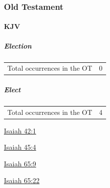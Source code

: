 	\subsubsection{Old Testament} %
		\label{ELECTION-OT}
	
		\paragraph{KJV}
			\label{ELECTION-OT-KJV}
			
			\subparagraph{Election}
	
				\begin{tabular}{ll}
					Total occurrences in the OT & 0
				\end{tabular}
			
			\subparagraph{Elect}
	
				\begin{tabular}{ll}
					Total occurrences in the OT & 4
				\end{tabular}
				
				\begin{compactdesc}
					\item[{\hyperref[ISAIAH-42-1]{Isaiah 42:1}}]
					\item[{\hyperref[ISAIAH-45-4]{Isaiah 45:4}}]
					\item[{\hyperref[ISAIAH-65-9]{Isaiah 65:9}}]
					\item[{\hyperref[ISAIAH-65-22]{Isaiah 65:22}}]
				\end{compactdesc}
			
		
			
				

